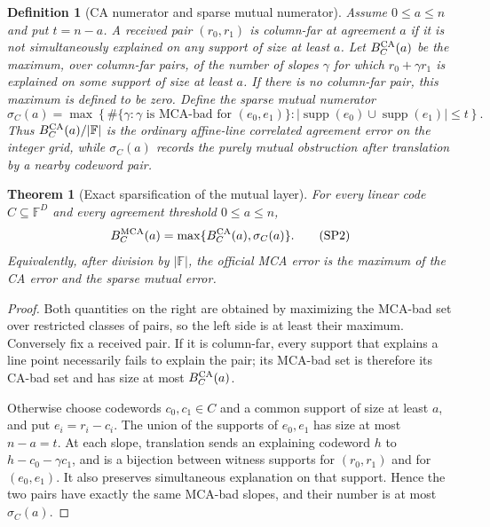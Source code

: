 \documentclass[11pt,a4paper]{amsart}
\numberwithin{equation}{section}
\newtheorem{theorem}{Theorem}[section]
\newtheorem{definition}[definition]{Definition}
\theoremstyle{remark}
\DeclareMathOperator{\supp}{supp}
\newcommand{\F}{\mathbb F}
\newcommand{\abs}[1]{\lvert #1\rvert}
\begin{document}
\begin{definition}[CA numerator and sparse mutual numerator]
\label{def:ca-sparse-numerators}
Assume \(0\le a\le n\) and put \(t=n-a\).  A received pair
\((r_0,r_1)\) is \emph{column-far at
agreement \(a\)} if it is not simultaneously explained on any support of
size at least \(a\).  Let \(B_C^{\rm CA}(a)\) be the maximum, over
column-far pairs, of the number of slopes \(\gamma\) for which
\(r_0+\gamma r_1\) is explained on some support of size at least \(a\).
If there is no column-far pair, this maximum is defined to be zero.
Define the \emph{sparse mutual numerator}
\[
 \sigma_C(a)=\max\left\{
 \#\{\gamma:\gamma\text{ is MCA-bad for }(e_0,e_1)\}:
 \abs{\supp(e_0)\cup\supp(e_1)}\le t\right\}.
 \tag{SP1}\label{eq:sparse-mutual-numerator}
\]
Thus \(B_C^{\rm CA}(a)/\abs\F\) is the ordinary affine-line correlated
agreement error on the integer grid, while \(\sigma_C(a)\) records the
purely mutual obstruction after translation by a nearby codeword pair.
\end{definition}

\begin{theorem}[Exact sparsification of the mutual layer]
\label{thm:exact-sparsification}
For every linear code \(C\subseteq\F^D\) and every agreement threshold
\(0\le a\le n\),
\[
 B_C^{\rm MCA}(a)=
 \max\{B_C^{\rm CA}(a),\sigma_C(a)\}.              \tag{SP2}
\label{eq:exact-sparsification}
\]
Equivalently, after division by \(\abs\F\), the official MCA error is the
maximum of the CA error and the sparse mutual error.
\end{theorem}

\begin{proof}
Both quantities on the right are obtained by maximizing the MCA-bad set
over restricted classes of pairs, so the left side is at least their
maximum.  Conversely fix a received pair.  If it is column-far, every
support that explains a line point necessarily fails to explain the pair;
its MCA-bad set is therefore its CA-bad set and has size at most
\(B_C^{\rm CA}(a)\).

Otherwise choose codewords \(c_0,c_1\in C\) and a common support of size
at least \(a\), and put \(e_i=r_i-c_i\).  The union of the supports of
\(e_0,e_1\) has size at most \(n-a=t\).  At each slope, translation sends
an explaining codeword \(h\) to
\(h-c_0-\gamma c_1\), and is a bijection between witness supports for
\((r_0,r_1)\) and for \((e_0,e_1)\).  It also preserves simultaneous
explanation on that support.  Hence the two pairs have exactly the same
MCA-bad slopes, and their number is at most \(\sigma_C(a)\).
\end{proof}
\end{document}
